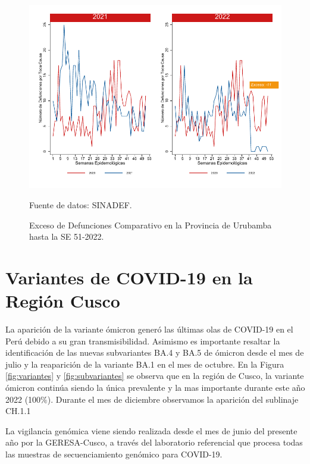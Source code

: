 \documentclass[12pt,a4paper,openany]{book}
\begin{document}
	\begin{figure}[h]
		\caption{Exceso de Defunciones Comparativo en la Provincia de Urubamba hasta la SE 51-2022.}\label{fig:exceso_urub}
		\begin{center}
			\includegraphics[width=0.7\linewidth]{../figuras/exceso_13.pdf}
		\end{center}
		{\footnotesize {Fuente de datos: SINADEF.}}
	\end{figure}
	
	\clearpage
	
	\clearpage
	
	\section* {Variantes de COVID-19 en la Región Cusco}
	\noindent La aparición de la variante ómicron generó las últimas olas de COVID-19 en el Perú debido a su gran transmisibilidad. Asimismo es importante resaltar la identificación de las nuevas subvariantes BA.4 y BA.5 de ómicron desde el mes de julio y la reaparición de la variante BA.1 en el mes de octubre. En la Figura \ref{fig:variantes} y \ref{fig:subvariantes} se observa que en la región de Cusco, la variante ómicron continúa siendo la única prevalente y la mas importante durante este año 2022 (100$\%$). Durante el mes de diciembre observamos la aparición del sublinaje CH.1.1
		 
	La vigilancia genómica viene siendo realizada desde el mes de junio del presente año por la GERESA-Cusco, a través del laboratorio referencial que procesa todas las muestras de secuenciamiento genómico para COVID-19.
	
\end{document}
